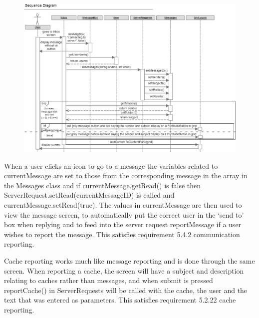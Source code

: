 \begin{figure}
    \centering
    \includegraphics[width=\textwidth]{images/sequence/inbox}
\end{figure}

When a user clicks an icon to go to a message the variables related to currentMessage are set to those from the corresponding message in the array in the Messages class and if currentMessage.getRead() is false then ServerRequest.setRead(currentMessageID) is called and currentMessage.setRead(true). The values in currentMessage are then used to view the message screen, to automatically put the correct user in the `send to' box when replying and to feed into the server request reportMessage if a user wishes to report the message. This satisfies requirement 5.4.2 communication reporting.

Cache reporting works much like message reporting and is done through the same screen. When reporting a cache, the screen will have a subject and description relating to caches rather than messages, and when submit is pressed reportCache() in ServerRequests will be called with the cache, the user and the text that was entered as parameters. This satisfies requirement 5.2.22 cache reporting.

